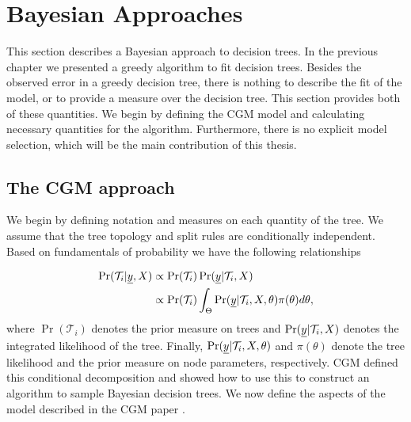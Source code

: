 \section{Bayesian Approaches}
\label{ch:p2sub_bayes}

This section describes a Bayesian approach to decision trees. In the previous chapter we presented a greedy algorithm to fit decision trees. Besides the observed error in a greedy decision tree, there is nothing to describe the fit of the model, or to  provide a measure over the decision tree. This section provides both of these quantities. We begin by defining the CGM model and calculating necessary quantities for the algorithm. Furthermore, there is no explicit model selection, which will be the main contribution of this thesis.    

\subsection{The CGM approach}
We begin by defining notation and measures on each quantity of the tree. 
We assume that the tree topology and split rules are conditionally independent. Based on fundamentals of probability we have the following relationships

\begin{align}
 \Pr(\mathcal{T}_i \vert \underline{y}, X ) &\propto \Pr(\mathcal{T}_i)\Pr(\underline{y} \vert \mathcal{T}_i, X)\nonumber \\
  &\propto \Pr(\mathcal{T}_i)\int_{\Theta}\Pr(\underline{y} \vert \mathcal{T}_i, X, \theta)\pi(\theta)d\theta,
\end{align}
where $\Pr(\mathcal{T}_i)$ denotes the prior measure on trees and $\Pr(\underline{y} \vert \mathcal{T}_i, X)$ denotes the integrated likelihood of the tree. Finally, $\Pr(\underline{y} \vert \mathcal{T}_i, X, \theta)$ and $\pi(\theta)$ denote the tree likelihood and the prior measure on node parameters, respectively. CGM \cite{chipman1998bayesian} defined this  conditional decomposition and showed how to use this to construct an algorithm to sample Bayesian decision trees. We now define the aspects of the model described in the CGM paper \cite{chipman1998bayesian}. 

